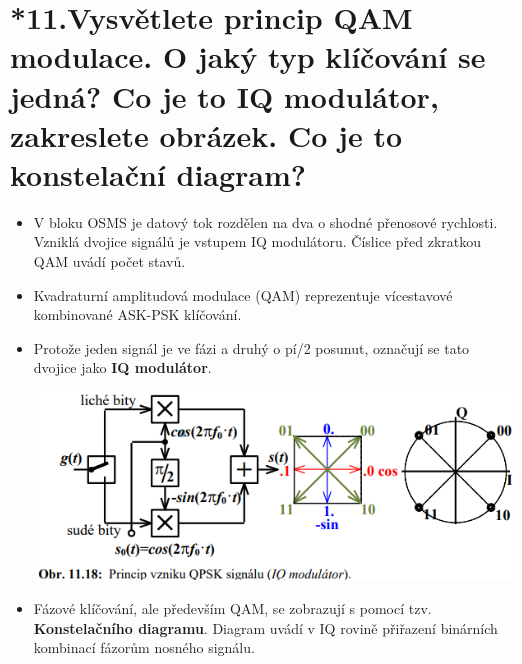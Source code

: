 \section{*11.Vysvětlete princip QAM modulace. O jaký typ klíčování se jedná? Co je to IQ modulátor, zakreslete obrázek. Co je to konstelační diagram? }
\begin{itemize}
    \item V bloku OSMS je datový tok rozdělen na dva o shodné přenosové rychlosti.  Vzniklá dvojice signálů je vstupem IQ modulátoru. Číslice před zkratkou QAM uvádí počet stavů.
    \item Kvadraturní amplitudová modulace (QAM) reprezentuje vícestavové kombinované ASK-PSK klíčování.
    \item Protože jeden signál je ve fázi a druhý o pí/2 posunut, označují se tato dvojice jako \textbf{IQ modulátor}.
    
    \includegraphics[]{images/image1.png}
    
    \item Fázové klíčování, ale především QAM, se zobrazují s pomocí tzv. \textbf{Konstelačního diagramu}. Diagram uvádí v IQ rovině přiřazení binárních kombinací fázorům nosného signálu.
\end{itemize}

